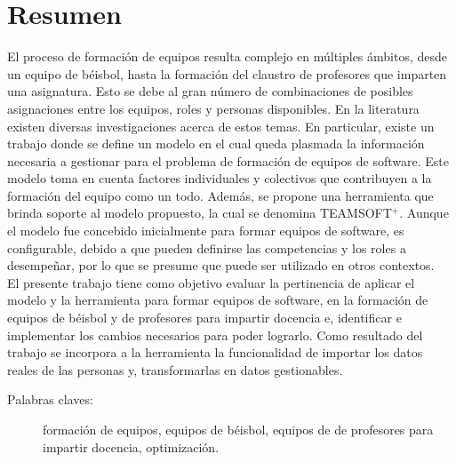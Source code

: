 \section*{Resumen}
El proceso de formación de equipos resulta complejo en múltiples ámbitos, desde un equipo de béisbol, hasta la formación del claustro de profesores que imparten una asignatura. Esto se debe al gran número de combinaciones de posibles asignaciones entre los equipos, roles y personas disponibles. En la literatura existen diversas investigaciones acerca de estos temas. En particular, existe un trabajo donde se define un modelo en el cual queda plasmada la información necesaria a gestionar para el problema de formación de equipos de software. Este modelo toma en cuenta factores individuales y colectivos que contribuyen a la formación del equipo como un todo. Además, se propone una herramienta que brinda soporte al modelo propuesto, la cual se denomina TEAMSOFT$^+$. Aunque el modelo fue concebido inicialmente para formar equipos de software, es configurable, debido a que pueden definirse las competencias y los roles a desempeñar, por lo que se presume que puede ser utilizado en otros contextos.\\

El presente trabajo tiene como objetivo evaluar la pertinencia de aplicar el modelo y la herramienta para formar equipos de software, en la formación de equipos de béisbol y de profesores para impartir docencia e, identificar e implementar los cambios necesarios para poder lograrlo. Como resultado del trabajo se incorpora a la herramienta la funcionalidad de importar los datos reales de las personas y, transformarlas en datos gestionables.

\begin{description}
	\item[Palabras claves:]{formación de equipos, equipos de béisbol, equipos de de profesores para impartir docencia, optimización.}
\end{description}


